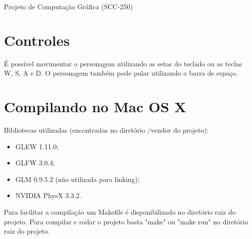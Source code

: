 \documentclass[a4paper, 12pt]{article}
\begin{document}
\begin{center}
{\Large Projeto de Computação Gráfica (SCC-250)}
\end{center}

\vspace{.5cm}

\section{Controles}

É possível movimentar o personagem utilizando as setas do teclado ou as teclas W, S, A e D. O personagem também pode pular utilizando a barra de espaço.

\section{Compilando no Mac OS X}

Bibliotecas utilizadas (encontradas no diretório /vendor do projeto):

\begin{itemize}
  \item GLEW 1.11.0;
  \item GLFW 3.0.4;
  \item GLM 0.9.5.2 (não utilizada para linking);
  \item NVIDIA PhysX 3.3.2.
\end{itemize}
\vspace{.5cm}

Para facilitar a compilação um Makefile é disponibilizado no diretório raiz do projeto. Para compilar e rodar o projeto basta "make" ou "make run" no diretório raiz do projeto.
\end{document}
